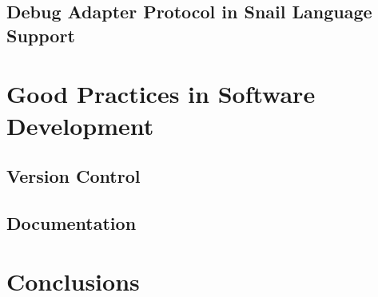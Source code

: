 \documentclass{article}
\begin{document}
\subsection{Debug Adapter Protocol in Snail Language Support}

\section{Good Practices in Software Development}

\subsection{Version Control}

\subsection{Documentation}

\section{Conclusions}

\newpage




\newpage
\end{document}
